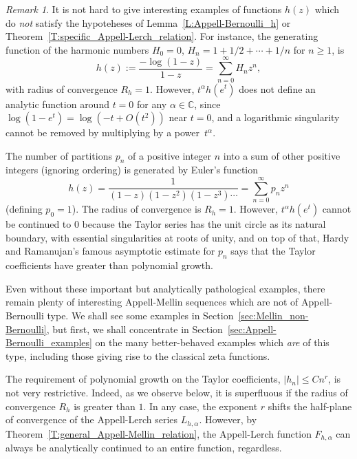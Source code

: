 \documentclass[11pt,a4paper]{amsart}
\newcommand{\C}{\mathbb{C}}
\theoremstyle{plain}
\theoremstyle{plain}
\theoremstyle{definition}
\theoremstyle{remark}
\newtheorem*{remark}{Remark}
\begin{document}
\begin{remark}
It is not hard to give interesting examples of functions $h(z)$ which do \emph{not} satisfy the hypoteheses of Lemma~\ref{L:Appell-Bernoulli_h} or Theorem~\ref{T:specific_Appell-Lerch_relation}. For instance, the generating function of the harmonic numbers $H_{0} = 0$, $H_{n} = 1 + 1/2 + \cdots + 1/n$ for $n \geq 1$, is
\[
	h(z) := \frac{-\log(1-z)}{1-z} = \sum_{n=0}^{\infty} H_{n} z^n,
\]
with radius of convergence $R_{h}=1$. However, $t^\alpha h(e^t)$ does not define an analytic function around $t=0$ for any $\alpha \in \C$, since $\log(1-e^t) = \log (-t + O(t^{2}))$ near $t = 0$, and a logarithmic singularity cannot be removed by multiplying by a power~$t^\alpha$.

The number of partitions $p_{n}$ of a positive integer $n$ into a sum of other positive integers (ignoring ordering) is generated by Euler's function
\[
	h(z) = \frac{1}{(1-z)(1-z^2)(1-z^3) \cdots} = \sum_{n=0}^{\infty} p_{n} z^n
\]
(defining $p_{0} = 1$). The radius of convergence is $R_{h}=1$. However, $t^{\alpha} h(e^{t})$ cannot be continued to $0$ because the Taylor series has the unit circle as its natural boundary, with essential singularities at roots of unity, and on top of that, Hardy and Ramanujan's famous asymptotic estimate for $p_{n}$ says that the Taylor coefficients have greater than polynomial growth.

Even without these important but analytically pathological examples, there remain plenty of interesting Appell-Mellin sequences which are not of Appell-Bernoulli type. We shall see some examples in Section~\ref{sec:Mellin_non-Bernoulli}, but first, we shall concentrate in Section~\ref{sec:Appell-Bernoulli_examples} on the many better-behaved examples which \emph{are} of this type, including those giving rise to the classical zeta functions.
\end{remark}



The requirement of polynomial growth on the Taylor coefficients, $|h_{n}| \leq C n^{r}$, is not very restrictive. Indeed, as we observe below, it is superfluous if the radius of convergence $R_{h}$ is greater than $1$. In any case, the exponent $r$ shifts the half-plane of convergence of the Appell-Lerch series $L_{h,\alpha}$. However, by Theorem~\ref{T:general_Appell-Mellin_relation}, the Appell-Lerch function $F_{h,\alpha}$ can always be analytically continued to an entire function, regardless.
\end{document}
